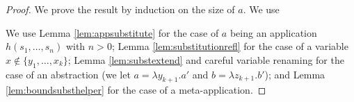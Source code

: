 \documentclass{lmcs}
\theoremstyle{theorem}\newtheorem{theorem}{Theorem}
\theoremstyle{theorem}\newtheorem{lemma}[theorem]{Lemma}
\theoremstyle{theorem}\newtheorem{corollary}[theorem]{Corollary}
\theoremstyle{definition}\newtheorem{definition}[theorem]{Definition}
\theoremstyle{definition}\newtheorem{example}[theorem]{Example}
\newcommand{\FV}{\mathit{FV}}
\newcommand{\identifier}[1]{\mathtt{#1}}
\newcommand{\afun}{\identifier{f}}
\newcommand{\avar}{x}
\newcommand{\bvar}{y}
\newcommand{\cvar}{z}
\newcommand{\abs}[2]{\lambda #1.#2}
\begin{document}
\begin{proof}
We prove the result by induction on the size of $a$.  We use

We use Lemma \ref{lem:appsubstitute} for the case of $a$ being an application $h(s_1,\dots,s_n)$ with $n > 0$;
Lemma \ref{lem:substitutionrefl} for the case of a variable $\avar \notin \{\bvar_1,\dots,\avar_k\}$;
Lemma \ref{lem:substextend} and careful variable renaming for the case of an abstraction (we let
$a = \abs{\bvar_{k+1}}{a'}$ and $b = \abs{\cvar_{k+1}}{b'}$); and
Lemma \ref{lem:boundsubsthelper} for the case of a meta-application.

\end{proof}
\end{document}
